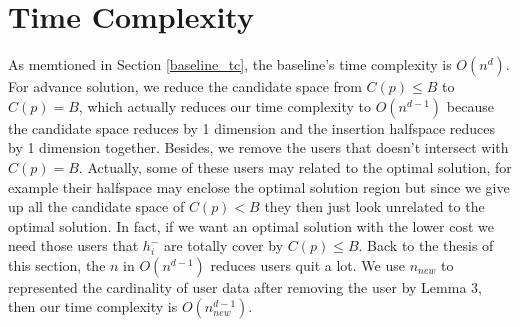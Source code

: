 \section{Time Complexity}
As memtioned in Section \ref{baseline_tc}, the baseline's time complexity is $O(n^d)$.
For advance solution, we reduce the candidate space from $C(p)\leq B$ to $C(p)=B$, 
which actually reduces our time complexity to $O(n^{d-1})$ because the candidate space
reduces by 1 dimension and the insertion halfspace reduces by 1 dimension together.
Besides, we remove the users that doesn't intersect with $C(p)=B$. Actually, some of these users
may related to the optimal solution, for example their halfspace may enclose
the optimal solution region but since we give up all the candidate space of 
$C(p)<B$ they then just look unrelated to the optimal solution. In fact, if we want
an optimal solution with the lower cost we need those users that $h_i^-$ are totally
cover by $C(p)\leq B$. Back to the thesis of this section, the $n$ in $O(n^{d-1})$
reduces users quit a lot. We use $n_{new}$ to represented the cardinality of 
user data after removing the user by Lemma 3, then our time complexity is $O(n_{new}^{d-1})$.

